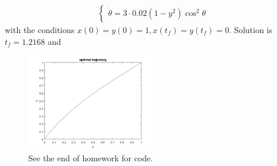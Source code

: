 \documentclass[12pt]{article}
\begin{document}
\begin{problem}[2]
\begin{enumerate}[label=(\alph*)]
\begin{align*}
\begin{cases}
	\dot{\theta} = 3 \cdot 0.02 (1-y^2) \cos^2 \theta
\end{cases}
\end{align*}
with the conditions $ x(0)=y(0)=1,x(t_f)=y(t_f)=0$. Solution is $ t_f = 1.2168$ and 
~\begin{figure}[H]
	\centering
	\includegraphics[width=0.5\textwidth]{./figures/5.2b.png}
	\caption{See the end of homework for code.}
\end{figure}
\end{enumerate}
\end{problem}
\end{document}
